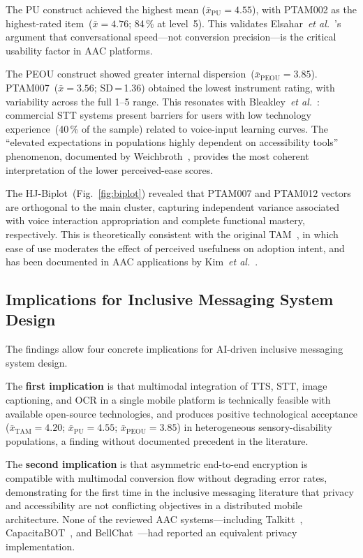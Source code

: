 \documentclass[journal]{IEEEtran}
\begin{document}
	The PU construct achieved the highest mean
	($\bar{x}_{\text{PU}}{=}4.55$), with PTAM002 as the
	highest-rated item~($\bar{x}{=}4.76$; 84\,\% at level~5).
	This validates Elsahar~\textit{et al.}~\cite{elsahar2019}'s
	argument that conversational speed---not conversion
	precision---is the critical usability factor in AAC platforms.
	
	The PEOU construct showed greater internal
	dispersion~($\bar{x}_{\text{PEOU}}{=}3.85$).
	PTAM007~($\bar{x}{=}3.56$; SD\,=\,1.36) obtained the lowest
	instrument rating, with variability across the full 1--5 range.
	This resonates with Bleakley~\textit{et al.}~\cite{bleakley2022}:
	commercial STT systems present barriers for users with low
	technology experience~(40\,\% of the sample) related to
	voice-input learning curves.
	The ``elevated expectations in populations highly dependent on
	accessibility tools'' phenomenon, documented by
	Weichbroth~\cite{weichbroth2020}, provides the most coherent
	interpretation of the lower perceived-ease scores.
	
	The HJ-Biplot~(Fig.~\ref{fig:biplot}) revealed that PTAM007
	and PTAM012 vectors are orthogonal to the main cluster,
	capturing independent variance associated with voice interaction
	appropriation and complete functional mastery, respectively.
	This is theoretically consistent with the original
	TAM~\cite{davis1989}, in which ease of use moderates the
	effect of perceived usefulness on adoption intent, and has
	been documented in AAC applications by
	Kim~\textit{et al.}~\cite{kim2024}.
	
	\subsection{Implications for Inclusive Messaging System Design}
	The findings allow four concrete implications for AI-driven
	inclusive messaging system design.
	
	The \textbf{first implication} is that multimodal integration of
	TTS, STT, image captioning, and OCR in a single mobile platform is
	technically feasible with available open-source technologies, and
	produces positive technological acceptance
	($\bar{x}_{\text{TAM}}{=}4.20$; $\bar{x}_{\text{PU}}{=}4.55$;
	$\bar{x}_{\text{PEOU}}{=}3.85$) in heterogeneous sensory-disability
	populations, a finding without documented precedent in the literature.
	
	The \textbf{second implication} is that asymmetric end-to-end
	encryption is compatible with multimodal conversion flow without
	degrading error rates, demonstrating for the first time in the
	inclusive messaging literature that privacy and accessibility are
	not conflicting objectives in a distributed mobile architecture.
	None of the reviewed AAC systems---including
	Talkitt~\cite{costanzo2023}, CapacitaBOT~\cite{mateos2022},
	and BellChat~\cite{guerrero2021bellchat}---had reported an
	equivalent privacy implementation.
	
\end{document}
